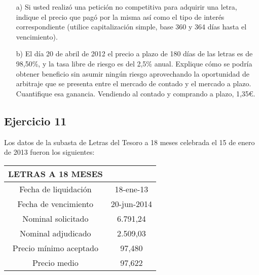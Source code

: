    \begin{enumerate}
        \item[a)] Si usted realizó una petición no competitiva para adquirir una letra, indique el precio que pagó por la misma así como el tipo de interés correspondiente (utilice capitalización simple, base 360 y 364 días hasta el vencimiento).
        
        \item[b)] El día 20 de abril de 2012 el precio a plazo de 180 días de las letras es de 98,50\%, y la tasa libre de riesgo es del 2,5\% anual. Explique cómo se podría obtener beneficio sin asumir ningún riesgo aprovechando la oportunidad de arbitraje que se presenta entre el mercado de contado y el mercado a plazo. Cuantifique esa ganancia. Vendiendo al contado y comprando a plazo, 1,35€.
    \end{enumerate}

    \subsection*{Ejercicio 11}

    Los datos de la subasta de Letras del Tesoro a 18 meses celebrada el 15 de enero de 2013 fueron los siguientes:

    \begin{table}[h!]
        \centering
        \begin{tabular}{|c|c|}
            \hline
            \textbf{LETRAS A 18 MESES} & \textbf{ } \\
            \hline
            Fecha de liquidación & 18-ene-13 \\
            \hline
            Fecha de vencimiento & 20-jun-2014 \\
            \hline
            Nominal solicitado & 6.791,24 \\
            \hline
            Nominal adjudicado & 2.509,03 \\
            \hline
            Precio mínimo aceptado & 97,480 \\
            \hline
            Precio medio & 97,622 \\
            \hline
        \end{tabular}
    \end{table}

